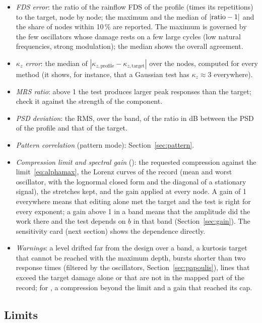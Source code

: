 \begin{itemize}
\item \emph{FDS error}: the ratio of the rainflow FDS of the profile (times its repetitions) to the
target, node by node; the maximum and the median of $|{\rm ratio}-1|$ and the share of nodes within
10\,\% are reported. The maximum is governed by the few oscillators whose damage rests on a few large
cycles (low natural frequencies, strong modulation); the median shows the overall agreement.
\item \emph{$\kappa_z$ error}: the median of $|\kappa_{z,\mathrm{profile}}-\kappa_{z,\mathrm{target}}|$
over the nodes, computed for every method (it shows, for instance, that a Gaussian test has
$\kappa_z\approx3$ everywhere).
\item \emph{MRS ratio}: above 1 the test produces larger peak responses than the target; check it
against the strength of the component.
\item \emph{PSD deviation}: the RMS, over the band, of the ratio in dB between the PSD of the profile and
that of the target.
\item \emph{Pattern correlation} (pattern mode): Section~\ref{sec:pattern}.
\item \emph{Compression limit and spectral gain} (): the requested compression against the
limit~\eqref{eq:alphamax}, the Lorenz curves of the record (mean and worst oscillator, with the lognormal
closed form and the diagonal of a stationary signal), the stretches kept, and the gain applied at every
node. A gain of 1 everywhere means that editing alone met the target and the test is right for every
exponent; a gain above 1 in a band means that the amplitude did the work there and the test depends
on $b$ in that band (Section~\ref{sec:gain}). The sensitivity card (next section) shows the
dependence directly.
\item \emph{Warnings}: a level drifted far from the design over a band, a kurtosis target that cannot
be reached with the maximum depth, bursts shorter than two response times (filtered by the oscillators,
Section~\ref{sec:papoulis}), lines that exceed the target damage alone or that are not in the mapped
part of the record; for , a compression beyond the limit and a gain that reached its cap.
\end{itemize}

\subsection{Limits}

